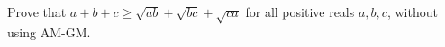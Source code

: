 Prove that $a+b+c\ge\sqrt{ab}+\sqrt{bc}+\sqrt{ca}$ for all positive reals $a,b,c$, without using AM-GM.
